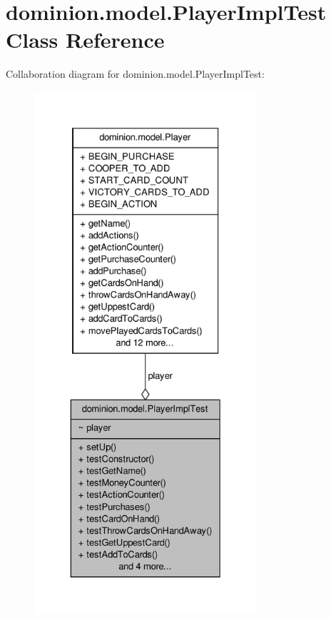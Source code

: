 \hypertarget{classdominion_1_1model_1_1PlayerImplTest}{\section{dominion.\-model.\-Player\-Impl\-Test \-Class \-Reference}
\label{classdominion_1_1model_1_1PlayerImplTest}
}


\-Collaboration diagram for dominion.\-model.\-Player\-Impl\-Test\-:
\nopagebreak
\begin{figure}[H]
\begin{center}
\leavevmode
\includegraphics[height=550pt]{classdominion_1_1model_1_1PlayerImplTest__coll__graph}
\end{center}
\end{figure}
